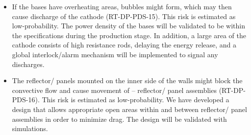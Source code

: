 \begin{itemize}
\item If the  bases have overheating areas, bubbles might form, which may then cause  discharge of the cathode (RT-DP-PDS-15). This risk is estimated as low-probability. The power density of the  bases will be validated to be within the specifications during the production stage. In addition, a large area of the cathode consists of high resistance rods, delaying the energy release, and a global interlock/alarm mechanism will %
be implemented to signal %
any discharges. 

\item The reflector/ panels mounted on the inner side of the  walls might block the  convective flow and cause movement of  -- reflector/ panel assemblies (RT-DP-PDS-16). This risk is estimated as low-probability. We have developed a design that allows appropriate open areas within and between reflector/ panel assemblies in order to minimize drag. The design will be validated with  simulations.


\end{itemize}
